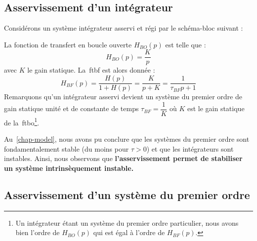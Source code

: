 \subsection{Asservissement d'un intégrateur}

Considérons un système intégrateur asservi et régi par le schéma-bloc suivant :
\begin{center}
\end{center}

La fonction de transfert en boucle ouverte $H_{BO}(p)$ est telle que :
$$
H_{BO}(p)=\dfrac{K}{p}
$$
avec $K$ le gain statique. 
La~\gls{ftbf} est alors donnée :
$$
H_{BF}(p)=\dfrac{H(p)}{1+H(p)}=\dfrac{K}{p+K}=\dfrac{1}{\tau_{BF} p+1}
$$
Remarquons qu'un intégrateur asservi devient un système du premier 
ordre de gain statique unité et de constante de temps $\tau_{BF}=\dfrac{1}{K}$ 
où $K$ est le gain statique de la~\gls{ftbo}\footnote{Un intégrateur étant 
un système du premier ordre particulier, nous avons bien l'ordre de $H_{BO}(p)$ qui est égal à l'ordre de $H_{BF}(p)$.}. 

Au~\cref{chap-model}, nous avons pu conclure que les systèmes du premier ordre 
sont fondamentalement stable (du moins pour $\tau>0$) et que les intégrateurs sont 
instables.
Ainsi, nous observons que \textbf{l'asservissement permet de stabiliser un système 
intrinsèquement instable.} 

\subsection{Asservissement d'un système du premier ordre}

